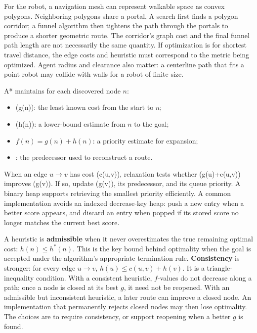 For the robot, a navigation mesh can represent walkable space as convex polygons. Neighboring polygons share a portal. A search first finds a polygon corridor; a funnel algorithm then tightens the path through the portals to produce a shorter geometric route. The corridor's graph cost and the final funnel path length are not necessarily the same quantity. If optimization is for shortest travel distance, the edge costs and heuristic must correspond to the metric being optimized. Agent radius and clearance also matter: a centerline path that fits a point robot may collide with walls for a robot of finite size.

A* maintains for each discovered node \(n\):

\begin{itemize}
\tightlist
\item
  (g(n)): the least known cost from the start to \(n\);
\item
  (h(n)): a lower-bound estimate from \(n\) to the goal;
\item
  \(f(n)=g(n)+h(n)\): a priority estimate for expansion;
\item
  : the predecessor used to reconstruct a route.
\end{itemize}

When an edge \(u\rightarrow v\) has cost (c(u,v)), relaxation tests whether (g(u)+c(u,v)) improves (g(v)). If so, update (g(v)), its predecessor, and its queue priority. A binary heap supports retrieving the smallest priority efficiently. A common implementation avoids an indexed decrease-key heap: push a new entry when a better score appears, and discard an entry when popped if its stored score no longer matches the current best score.

A heuristic is \textbf{admissible} when it never overestimates the true remaining optimal cost: \(h(n)\leq h^*(n)\). This is the key bound behind optimality when the goal is accepted under the algorithm's appropriate termination rule. \textbf{Consistency} is stronger: for every edge \(u\rightarrow v\), \(h(u)\leq c(u,v)+h(v)\). It is a triangle-inequality condition. With a consistent heuristic, \(f\)-values do not decrease along a path; once a node is closed at its best \(g\), it need not be reopened. With an admissible but inconsistent heuristic, a later route can improve a closed node. An implementation that permanently rejects closed nodes may then lose optimality. The choices are to require consistency, or support reopening when a better \(g\) is found.

